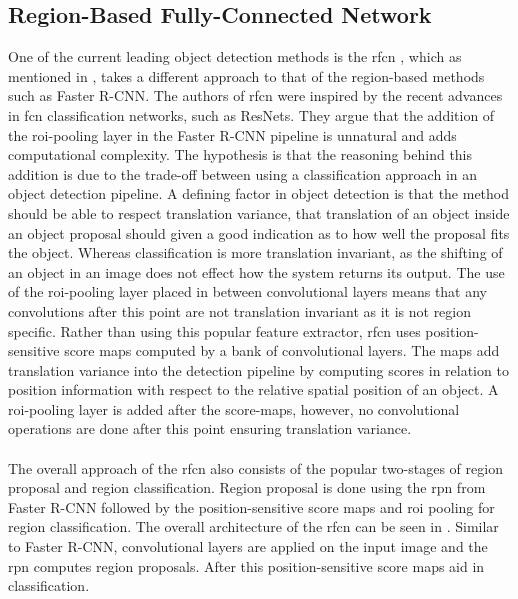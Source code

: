 \subsection{Region-Based Fully-Connected Network}
One of the current leading object detection methods is the \gls{rfcn} \cite{rfcn}, which as mentioned in , takes a different approach to that of the region-based methods such as Faster R-CNN. The authors of \gls{rfcn} were inspired by the recent advances in \gls{fcn} classification networks, such as ResNets. They argue that the addition of the \gls{roi}-pooling layer in the Faster R-CNN pipeline is unnatural and adds computational complexity. The hypothesis is that the reasoning behind this addition is due to the trade-off between using a classification approach in an object detection pipeline. A defining factor in object detection is that the method should be able to respect translation variance, that translation of an object inside an object proposal should given a good indication as to how well the proposal fits the object. Whereas classification is more translation invariant, as the shifting of an object in an image does not effect how the system returns its output. The use of the \gls{roi}-pooling layer placed in between convolutional layers means that any convolutions after this point are not translation invariant as it is not region specific. Rather than using this popular feature extractor, \gls{rfcn} uses position-sensitive score maps computed by a bank of convolutional layers. The maps add translation variance into the detection pipeline by computing scores in relation to position information with respect to the relative spatial position of an object. A \gls{roi}-pooling layer is added after the score-maps, however, no convolutional operations are done after this point ensuring translation variance.
\\\\
The overall approach of the \gls{rfcn} also consists of the popular two-stages of region proposal and region classification. Region proposal is done using the \gls{rpn} from Faster R-CNN followed by the position-sensitive score maps and \gls{roi} pooling for region classification. The overall architecture of the \gls{rfcn} can be seen in . Similar to Faster R-CNN, convolutional layers are applied on the input image and the \gls{rpn} computes region proposals. After this position-sensitive score maps aid in classification.



